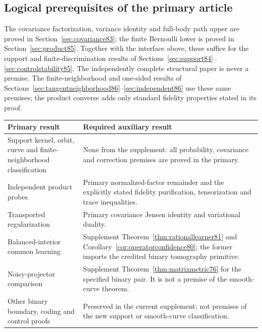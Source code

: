 \subsection{Logical prerequisites of the primary article}
The covariance factorization, variance identity and full-body path
upper are proved in Section~\ref{sec:covariance83}; the finite
Bernoulli lower is proved in Section~\ref{sec:product85}.  Together
with the interface above, these suffice for the support and
finite-discrimination results of
Sections~\ref{sec:support84}--\ref{sec:controlstability85}.
The independently complete structural paper is never a premise.
The finite-neighborhood and one-sided results of
Sections~\ref{sec:tangentneighborhood86}--\ref{sec:independent86}
use these same premises; the product converse adds only standard
fidelity properties stated in its proof.
\begin{center}
\begin{tabular}{@{}>{\raggedright\arraybackslash}p{}>{\raggedright\arraybackslash}p{}@{}}
\toprule
Primary result & Required auxiliary result\\
\midrule
Support kernel, orbit, curve and finite-neighborhood classification &
None from the supplement: all probability, covariance and correction
premises are proved in the primary.\\
Independent product probes &
Primary normalized-factor remainder and the explicitly stated
fidelity purification, tensorization and trace inequalities.\\
Transported regularization &
Primary covariance Jensen identity and variational duality.\\
Balanced-interior common learning &
Supplement Theorem~\ref{thm:rationallearner81} and
Corollary~\ref{cor:operatorconfidence80}; the former imports the
credited binary tomography primitive.\\
Noisy-projector comparison &
Supplement Theorem~\ref{thm:matrixmetric76} for the specified binary
pair. It is not a premise of the smooth-curve theorem.\\
Other binary boundary, coding and control proofs &
Preserved in the current supplement; not premises of the new
support or smooth-curve classification.\\
\bottomrule
\end{tabular}
\end{center}
